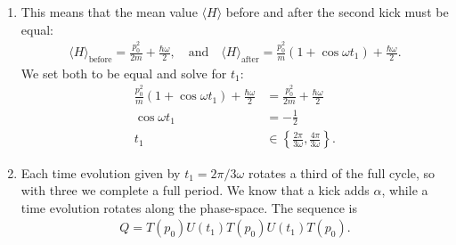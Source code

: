 \documentclass[letterpaper,11pt,twoside]{article}
\newcommand{\braket}[1]{\langle#1\rangle}
\begin{document}
\begin{enumerate}[itemsep=0pt,topsep=0pt,label=\alph*)]
  \item This means that the mean value $\braket{H}$ before and after the second kick must be equal:
  \begin{align*}
    \braket{H}_{\text{before}}=\frac{p_0^2}{2m}+\frac{\hbar\omega}{2},\quad\text{and}\quad\braket{H}_{\text{after}}=\frac{p^2_0}{m}(1+\cos\omega t_1)+\frac{\hbar\omega}{2}.
  \end{align*}
  We set both to be equal and solve for $t_1$:
  \begin{align*}
    \frac{p^2_0}{m}(1+\cos\omega t_1)+\frac{\hbar\omega}{2}&=\frac{p_0^2}{2m}+\frac{\hbar\omega}{2}\\
    \cos\omega t_1&=-\frac{1}{2}\\
    t_1&\in\left\{\frac{2\pi}{3\omega},\frac{4\pi}{3\omega}\right\}.
  \end{align*}
  \item Each time evolution given by $t_1=2\pi/3\omega$ rotates a third of the full cycle, so with three we complete a full period. We know that a kick adds $\alpha$, while a time evolution 
  rotates along the phase-space. The sequence is
  \begin{align*}
    Q=T(p_0)U(t_1)T(p_0)U(t_1)T(p_0).
  \end{align*}
\end{enumerate}


\end{document}
